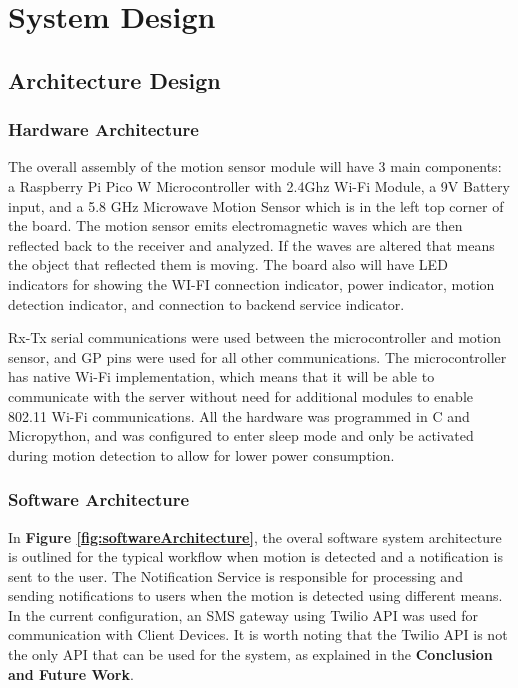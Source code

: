 \section{System Design}\label{sec:system-design}

\subsection{Architecture Design}\label{subsec:architecture-design}

\subsubsection{Hardware Architecture}


The overall assembly of the motion sensor module will have 3 main components: a Raspberry Pi
Pico W Microcontroller with 2.4Ghz Wi-Fi Module, a 9V Battery input, and a 5.8 GHz Microwave
Motion Sensor which is in the left top corner of the board. The motion sensor emits
electromagnetic waves which are then reflected back to the receiver and analyzed. If the waves
are altered that means the object that reflected them is moving. The board also will have LED
indicators for showing the WI-FI connection indicator, power indicator, motion detection
indicator, and connection to backend service indicator.

Rx-Tx serial communications were used between the microcontroller and motion sensor, and GP
pins were used for all other communications. The microcontroller has native Wi-Fi
implementation, which means that it will be able to communicate with the server without need
for additional modules to enable 802.11 Wi-Fi communications. All the hardware was
programmed in C and Micropython, and was configured to enter sleep mode and only be activated
during motion detection to allow for lower power consumption.

\subsubsection{Software Architecture}

In \textbf{Figure \ref{fig:softwareArchitecture}}, the overal software system architecture is
outlined for the typical workflow when motion is detected and a notification is sent to the
user. The Notification Service is responsible for processing and sending notifications to
users when the motion is detected using different means. In the current configuration, an SMS
gateway using Twilio API was used for communication with Client Devices. It is worth noting
that the Twilio API is not the only API that can be used for the system, as explained in the
\textbf{Conclusion and Future Work}.

